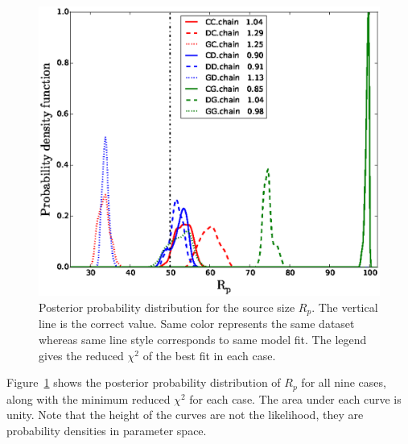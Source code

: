\documentclass[usenatbib]{mn2e}
\begin{document}
\begin{figure}
\centering
  \includegraphics[width=0.9\hsize]{figures/Rp4all.eps}
\caption{\label{fig:mcmc} Posterior probability distribution for the
  source size $R_p$.  The vertical line is the correct value. Same
  color represents the same dataset whereas same line style
  corresponds to same model fit.  The legend gives the reduced
  $\chi^2$ of the best fit in each case.}
\end{figure}

Figure~\ref{fig:mcmc} shows the posterior probability distribution of
$R_p$ for all nine cases, along with the minimum reduced $\chi^2$ for
each case.  The area under each curve is unity. Note that the height
of the curves are not the likelihood, they are probability densities
in parameter space.
\end{document}
